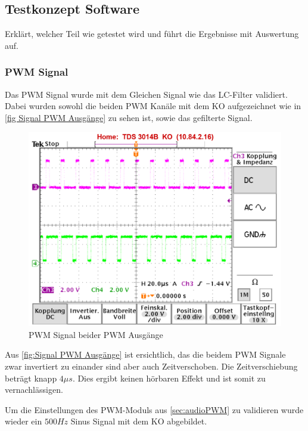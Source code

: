 \subsection{Testkonzept Software}\label{sec:testkonzeptSoftware}

Erklärt, welcher Teil wie getestet wird und führt die Ergebnisse mit Auswertung auf.




\subsubsection{PWM Signal}\label{sec: Validierung PWM Signal}
Das PWM Signal wurde mit dem Gleichen Signal wie das LC-Filter validiert. Dabei wurden sowohl die beiden PWM Kanäle mit dem KO aufgezeichnet wie in \autoref{fig Signal PWM Ausgänge} zu sehen ist, sowie das gefilterte Signal. 

\begin{figure}[ht!]
\center
\includegraphics[scale=1.0]{data/PWM_Signal_500Hz_Mono_mit_Infos.png}
\caption{PWM Signal beider PWM Ausgänge}
\label{fig:Signal PWM Ausgänge}
\end{figure}

Aus \autoref{fig:Signal PWM Ausgänge} ist ersichtlich, das die beidem PWM Signale zwar invertiert zu einander sind aber auch Zeitverschoben. Die Zeitverschiebung beträgt knapp $4\mu s$. Dies ergibt keinen hörbaren Effekt und ist somit zu vernachlässigen.

Um die Einstellungen des PWM-Moduls aus \ref{sec:audioPWM} zu validieren wurde wieder ein $500Hz$ Sinus Signal mit dem KO abgebildet.


